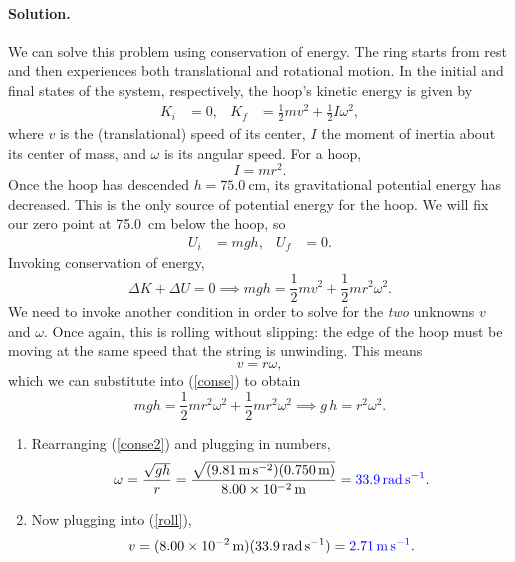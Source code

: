 \documentclass[11pt]{article}
\newcommand{\refeq}[1]{(\ref{#1})}
\newcommand{\beq}{\begin{equation*}}
\newcommand{\eeq}{\end{equation*}}
\newcommand{\beqn}{\begin{equation}}
\newcommand{\eeqn}{\end{equation}}
\newenvironment{solution}
{
    \paragraph{Solution.}
    \ignorespaces
}
{
    \bigskip
}
\begin{document}
\begin{solution}
	We can solve this problem using conservation of energy.  The ring starts from rest and then experiences both translational and rotational motion.  In the initial and final states of the system, respectively, the hoop's kinetic energy is given by
	\begin{align*}
		K_i &= 0, &
		K_f &= \frac{1}{2} m v^2 + \frac{1}{2} I \omega^2,
	\end{align*}
	where $v$ is the (translational) speed of its center, $I$ the moment of inertia about its center of mass, and $\omega$ is its angular speed.  For a hoop,
	\beq
		I = m r^2.
	\eeq
	Once the hoop has descended $h = \SI{75.0}{\centi\meter}$, its gravitational potential energy has decreased.  This is the only source of potential energy for the hoop.  We will fix our zero point at \SI{75.0}{\cm} below the hoop, so
	\begin{align*}
		U_i &= mg h, &
		U_f &= 0.
	\end{align*}
	Invoking conservation of energy,
	\beqn \label{conse}
		\Delta K + \Delta U = 0 \implies mg h = \frac{1}{2} m v^2 + \frac{1}{2} m r^2 \omega^2.
	\eeqn
	We need to invoke another condition in order to solve for the \emph{two} unknowns $v$ and $\omega$.  Once again, this is rolling without slipping: the edge of the hoop must be moving at the same speed that the string is unwinding.  This means
	\beqn \label{roll}
		v = r \omega,
	\eeqn
	which we can substitute into \refeq{conse} to obtain
	\beqn \label{conse2}
		m g h = \frac{1}{2} m r^2 \omega^2 + \frac{1}{2} m r^2 \omega^2 \implies g \,h = r^2 \omega^2.
	\eeqn
	
	\begin{enumerate}
		\item Rearranging \refeq{conse2} and plugging in numbers,
			\beq
				\omega = \frac{\sqrt{g h}}{r} = \frac{\sqrt{(\sig) (\SI{0.750}{\meter})}}{\SI{8.00e-2}{\meter}} = {\color{blue} \SI{33.9}{\radian\per\second}}.
			\eeq
			
		\item Now plugging into \refeq{roll},
			\beq
				v = (\SI{8.00e-2}{\meter}) (\SI{33.9}{\radian\per\second}) = {\color{blue} \SI{2.71}{\meter\per\second}}.
			\eeq
	\end{enumerate}
\end{solution}
\end{document}
